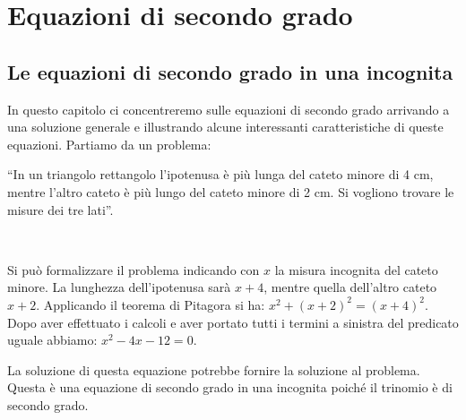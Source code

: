 


\chapter{Equazioni di secondo grado}


\section{Le equazioni di secondo grado in una incognita}
\label{sec:eq2gr_definizione}

In questo capitolo ci concentreremo sulle equazioni di secondo grado 
arrivando a una soluzione generale e illustrando alcune interessanti 
caratteristiche di queste equazioni.
Partiamo da un problema: 

\begin{problema}{}{}
``In un triangolo rettangolo l'ipotenusa è 
più lunga del cateto minore di 4 cm, mentre l'altro cateto è più lungo del 
cateto minore di 2 cm. Si vogliono trovare le misure dei tre lati''.
\end{problema}

\begin{soluzione}{}{}~

{Si può formalizzare il problema indicando con \(x\) la misura incognita 
del cateto minore. 
La lunghezza dell'ipotenusa sarà \(x +4\), mentre quella dell'altro 
cateto \(x +2\). 
Applicando il teorema di Pitagora si ha: 
\(x^2 +(x +2 )^2 = ( x +4 )^2\). 
}{
{\triaa}
}
Dopo aver effettuato i calcoli e aver portato tutti i 
termini a sinistra del predicato uguale abbiamo: \(x^2-4x-12=0\).

La soluzione di questa equazione potrebbe fornire la soluzione al problema.
Questa è una equazione di secondo grado in una incognita poiché il trinomio 
è di secondo grado.
\end{soluzione}

